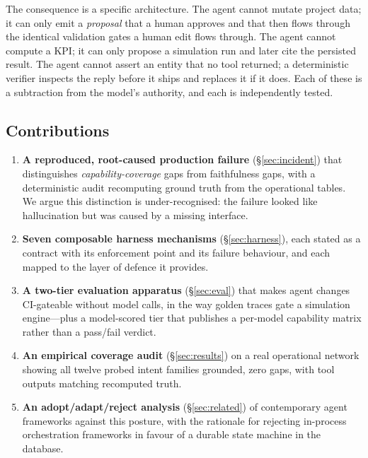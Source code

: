\documentclass[conference]{IEEEtran}
\begin{document}
The consequence is a specific architecture. The agent cannot mutate project data;
it can only emit a \emph{proposal} that a human approves and that then flows
through the identical validation gates a human edit flows through. The agent
cannot compute a KPI; it can only propose a simulation run and later cite the
persisted result. The agent cannot assert an entity that no tool returned; a
deterministic verifier inspects the reply before it ships and replaces it if it
does. Each of these is a subtraction from the model's authority, and each is
independently tested.

\subsection*{Contributions}

\begin{enumerate}
  \item \textbf{A reproduced, root-caused production failure} (\S\ref{sec:incident})
        that distinguishes \emph{capability-coverage} gaps from faithfulness
        gaps, with a deterministic audit recomputing ground truth from the
        operational tables. We argue this distinction is under-recognised: the
        failure looked like hallucination but was caused by a missing interface.
  \item \textbf{Seven composable harness mechanisms} (\S\ref{sec:harness}), each
        stated as a contract with its enforcement point and its failure
        behaviour, and each mapped to the layer of defence it provides.
  \item \textbf{A two-tier evaluation apparatus} (\S\ref{sec:eval}) that makes
        agent changes CI-gateable without model calls, in the way golden traces
        gate a simulation engine---plus a model-scored tier that publishes a
        per-model capability matrix rather than a pass/fail verdict.
  \item \textbf{An empirical coverage audit} (\S\ref{sec:results}) on a real
        operational network showing all twelve probed intent families grounded,
        zero gaps, with tool outputs matching recomputed truth.
  \item \textbf{An adopt/adapt/reject analysis} (\S\ref{sec:related}) of
        contemporary agent frameworks against this posture, with the rationale
        for rejecting in-process orchestration frameworks in favour of a durable
        state machine in the database.
\end{enumerate}
\end{document}
